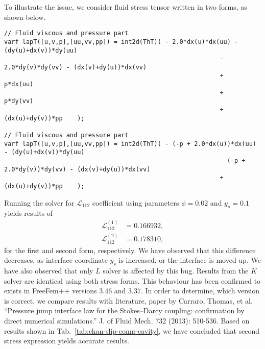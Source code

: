 \documentclass[12pt,a4paper]{article}
\begin{document}
To illustrate the issue, we consider fluid stress tensor written in two forms, as shown below.
\begin{lstlisting}
// Fluid viscous and pressure part                                                                                                                            
varf lapT([u,v,p],[uu,vv,pp]) = int2d(ThT)( - 2.0*dx(u)*dx(uu) - (dy(u)+dx(v))*dy(uu)
                                                           - 2.0*dy(v)*dy(vv) - (dx(v)+dy(u))*dx(vv)
                                                           +         p*dx(uu)
                                                           +         p*dy(vv)
                                                           + (dx(u)+dy(v))*pp    );
                                                           
// Fluid viscous and pressure part                                                                                                                            
varf lapT([u,v,p],[uu,vv,pp]) = int2d(ThT)( - (-p + 2.0*dx(u))*dx(uu) - (dy(u)+dx(v))*dy(uu)
                                                           - (-p + 2.0*dy(v))*dy(vv) - (dx(v)+dy(u))*dx(vv)
                                                           + (dx(u)+dy(v))*pp    );
\end{lstlisting}

Running the solver for $\mathcal{L}_{112}$ coefficient using parameters $\phi = 0.02$ and $y_s = 0.1$ yields results of
\begin{align}
\mathcal{L}^{(1)}_{112} & = 0.166932, \\
\mathcal{L}^{(2)}_{112} & = 0.178310,
\end{align}
for the first and second form, respectively.
We have observed that this difference decreases, as interface coordinate 
$y_s$ is increased, or the interface is moved up. 
We have also observed that only $L$ solver is
affected by this bug. Results from the $K$ solver are identical using both stress forms.
This behaviour has been confirmed to exists in FreeFem++ versions $3.46$ and $3.37$. In order to determine, which version is correct, we compare results with literature, paper by Carraro, Thomas,
et al. ``Pressure jump interface law for the Stokes--Darcy coupling: confirmation by direct
numerical simulations.'' J. of Fluid Mech. 732 (2013): 510-536. Based on results shown in
Tab.~\ref{tab:chan-slip-comp-cavity}, we have concluded that second stress expression yields
accurate results.
\end{document}
